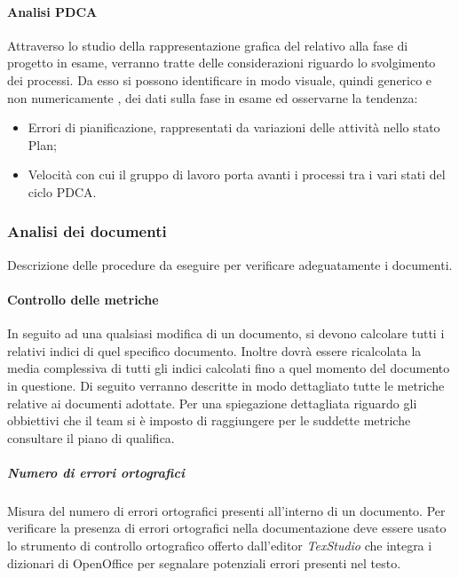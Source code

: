 \paragraph{Analisi PDCA} \Spazio
Attraverso lo studio della rappresentazione grafica del  relativo alla fase di progetto in esame, verranno tratte delle considerazioni riguardo lo svolgimento dei processi.
Da esso si possono identificare in modo visuale, quindi generico e non numericamente , dei dati sulla fase in esame ed osservarne la tendenza:
\begin{itemize}
	\item Errori di pianificazione, rappresentati da variazioni delle attività nello stato
	Plan;
	\item Velocità con cui il gruppo di lavoro porta avanti i processi tra i vari stati del
	ciclo PDCA.
\end{itemize}



\subsubsection{Analisi dei documenti}
 Descrizione delle procedure da eseguire per verificare adeguatamente i documenti.
\paragraph{Controllo delle metriche} \Spazio
In seguito ad una qualsiasi modifica di un documento, si devono calcolare tutti i relativi indici di quel specifico documento. Inoltre dovrà essere ricalcolata la media complessiva di tutti gli indici calcolati fino a quel momento del documento in questione.
Di seguito verranno descritte in modo dettagliato tutte le metriche relative ai documenti adottate. Per una spiegazione dettagliata riguardo gli obbiettivi che il team si è imposto di raggiungere per le suddette metriche consultare il piano di qualifica.

\subparagraph{Numero di errori ortografici}\Spazio
Misura del numero di errori ortografici presenti all'interno di un documento.
Per verificare la presenza di errori ortografici nella documentazione deve essere usato lo strumento di controllo ortografico offerto dall'editor \emph{TexStudio} che integra i dizionari di OpenOffice per segnalare potenziali errori presenti nel testo.


